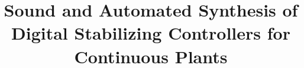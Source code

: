 \documentclass{sig-alternate-05-2015}
\begin{document}

\doi{}

\isbn{}

%

\title{
Sound and Automated Synthesis of Digital Stabilizing Controllers for Continuous Plants
}
%
%
%
%
%
\end{document}

